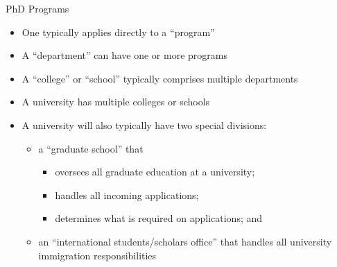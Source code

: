\begin{frame}[fragile]{PhD Programs}
\begin{itemize}
    \item One typically applies directly to a ``program''
    \item A ``department'' can have one or more programs
    \item A ``college'' or ``school'' typically comprises multiple departments
    \item A university has multiple colleges or schools
    \item A university will also typically have two special divisions:
    \begin{itemize} 
        \item a ``graduate school'' that
        \begin{itemize}
            \item oversees all graduate education at a university;
            \item handles all incoming applications;
            \item determines what is required on applications; and
        \end{itemize}
        \item an ``international students/scholars office'' that handles all university immigration responsibilities
    \end{itemize}
\end{itemize}
\end{frame}


